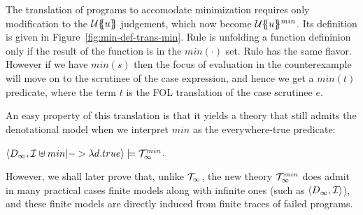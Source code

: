 \newcommand{\SDownarrow}{\downarrow}

The translation of programs to accomodate minimization requires only modification 
to the ${\cal U}\{\!\!\{u\}\!\!\}$ judgement, which now become ${\cal U}\{\!\!\{u\}\!\!\}^{min}$. Its definition
is given in Figure~\ref{fig:min-def-trans-min}. Rule  is unfolding a function
defininion only if the result of the function is in the $min(\cdot)$ set. Rule 
has the same flavor. However if we have $min(s)$ then the focus of evaluation in the counterexample
will move on to the scrutinee of the case expression, and hence we get a $min(t)$ predicate, where the 
term $t$ is the FOL translation of the case scrutinee $e$.

An easy property of this translation is that it yields a theory that still admits the denotational model 
when we interpret $min$ as the everywhere-true predicate:
\begin{theorem} $\langle D_\infty, {\cal I}\uplus min |-> \lambda d.true\rangle \models {\cal T}_{\infty}^{min}$. \end{theorem} 

However, we shall later prove that, unlike ${\cal T}_\infty$, the new theory ${\cal T}_{\infty}^{min}$ does admit in many practical 
cases finite models along with infinite ones (such as $\langle D_{\infty},{\cal I}\rangle$), and these finite 
models are directly induced from finite traces of failed programs.



